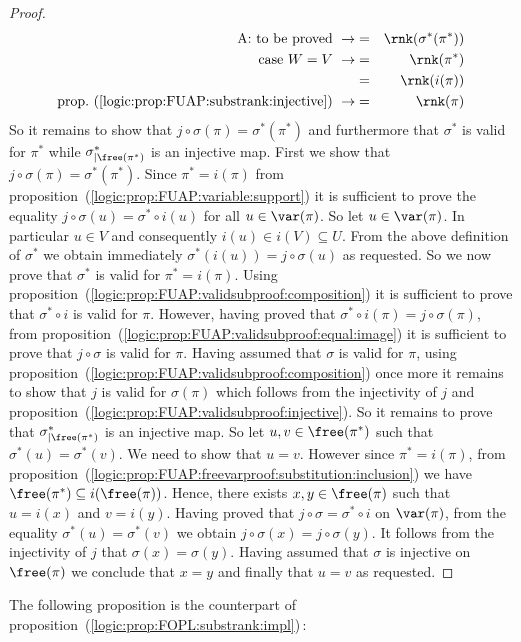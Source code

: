 \begin{proof}
\begin{eqnarray*}
    \mbox{A: to be proved}\ \rightarrow&=&\rnk(\sigma^{*}(\pi^{*}))\\
    \mbox{case $W=V$}\ \rightarrow&=&\rnk(\pi^{*})\\
    &=&\rnk(i(\pi))\\
    \mbox{prop.~(\ref{logic:prop:FUAP:substrank:injective})}\ \rightarrow
    &=&\rnk(\pi)
    \end{eqnarray*}
So it remains to show that $j\circ\sigma(\pi)=\sigma^{*}(\pi^{*})$
and furthermore that $\sigma^{*}$ is valid for $\pi^{*}$ while
$\sigma^{*}_{|\free(\pi^{*})}$ is an injective map. First we show
that $j\circ\sigma(\pi)=\sigma^{*}(\pi^{*})$. Since $\pi^{*}=i(\pi)$
from proposition~(\ref{logic:prop:FUAP:variable:support}) it is
sufficient to prove the equality $j\circ\sigma(u)=\sigma^{*}\circ
i(u)$ for all $u\in\var(\pi)$. So let $u\in\var(\pi)$. In particular
$u\in V$ and consequently $i(u)\in i(V)\subseteq U$. From the above
definition of $\sigma^{*}$ we obtain immediately
$\sigma^{*}(i(u))=j\circ\sigma(u)$ as requested. So we now prove
that $\sigma^{*}$ is valid for $\pi^{*}=i(\pi)$. Using
proposition~(\ref{logic:prop:FUAP:validsubproof:composition}) it is
sufficient to prove that $\sigma^{*}\circ i$ is valid for $\pi$.
However, having proved that $\sigma^{*}\circ
i(\pi)=j\circ\sigma(\pi)$, from
proposition~(\ref{logic:prop:FUAP:validsubproof:equal:image}) it is
sufficient to prove that $j\circ\sigma$ is valid for $\pi$. Having
assumed that $\sigma$ is valid for $\pi$, using
proposition~(\ref{logic:prop:FUAP:validsubproof:composition}) once
more it remains to show that $j$ is valid for $\sigma(\pi)$ which
follows from the injectivity of $j$ and
proposition~(\ref{logic:prop:FUAP:validsubproof:injective}). So it
remains to prove that $\sigma^{*}_{|\free(\pi^{*})}$ is an injective
map. So let $u,v\in \free(\pi^{*})$ such that
$\sigma^{*}(u)=\sigma^{*}(v)$. We need to show that $u=v$. However
since $\pi^{*}=i(\pi)$, from
proposition~(\ref{logic:prop:FUAP:freevarproof:substitution:inclusion})
we have $\free(\pi^{*})\subseteq i(\free(\pi))$. Hence, there exists
$x,y\in\free(\pi)$ such that $u=i(x)$ and $v=i(y)$. Having proved
that $j\circ\sigma =\sigma^{*}\circ i$ on $\var(\pi)$, from the
equality $\sigma^{*}(u)=\sigma^{*}(v)$ we obtain
$j\circ\sigma(x)=j\circ\sigma(y)$. It follows from the injectivity
of $j$ that $\sigma(x)=\sigma(y)$. Having assumed that $\sigma$ is
injective on $\free(\pi)$ we conclude that $x=y$ and finally that
$u=v$ as requested.
\end{proof}

The following proposition is the counterpart of
proposition~(\ref{logic:prop:FOPL:substrank:impl})\,:

